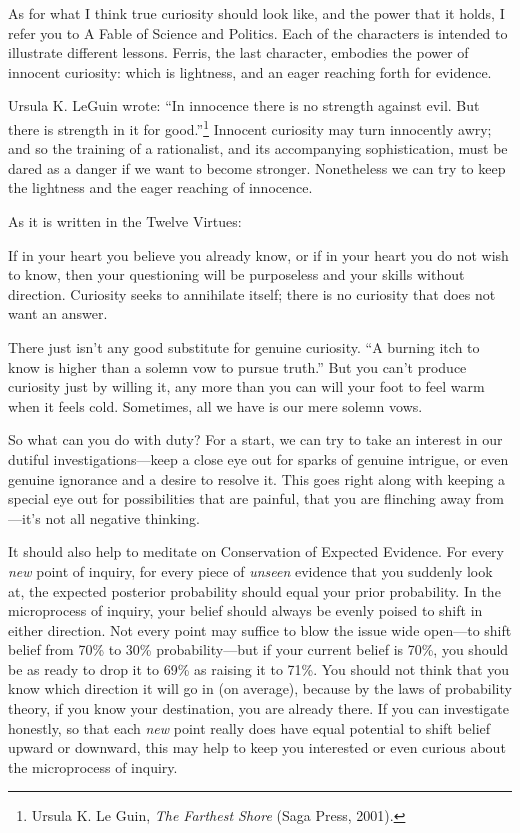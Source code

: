 {
 As for what I think true curiosity should look like, and the power
that it holds, I refer you to A Fable of Science and Politics. Each of
the characters is intended to illustrate different lessons. Ferris, the
last character, embodies the power of innocent curiosity: which is
lightness, and an eager reaching forth for evidence.}

{
 Ursula K. LeGuin wrote: ``In innocence there is
no strength against evil. But there is strength in it for
good.''\footnote{Ursula K. Le Guin, \textit{The Farthest Shore} (Saga Press,
2001).} Innocent curiosity may
turn innocently awry; and so the training of a rationalist, and its
accompanying sophistication, must be dared as a danger if we want to
become stronger. Nonetheless we can try to keep the lightness and the
eager reaching of innocence.}

{
 As it is written in the Twelve Virtues:}

{
 If in your heart you believe you already know, or if in your heart
you do not wish to know, then your questioning will be purposeless and
your skills without direction. Curiosity seeks to annihilate itself;
there is no curiosity that does not want an answer.}

{
 There just isn't any good substitute for genuine
curiosity. ``A burning itch to know is higher than a
solemn vow to pursue truth.'' But you
can't produce curiosity just by willing it, any more
than you can will your foot to feel warm when it feels cold. Sometimes,
all we have is our mere solemn vows.}

{
 So what can you do with duty? For a start, we can try to take an
interest in our dutiful investigations---keep a close eye out for
sparks of genuine intrigue, or even genuine ignorance and a desire to
resolve it. This goes right along with keeping a special eye out for
possibilities that are painful, that you are flinching away
from---it's not all negative thinking.}

{
 It should also help to meditate on Conservation of Expected
Evidence. For every \textit{new} point of inquiry, for every piece of
\textit{unseen} evidence that you suddenly look at, the expected
posterior probability should equal your prior probability. In the
microprocess of inquiry, your belief should always be evenly poised to
shift in either direction. Not every point may suffice to blow the
issue wide open---to shift belief from 70\% to 30\% probability---but
if your current belief is 70\%, you should be as ready to drop it to
69\% as raising it to 71\%. You should not think that you know which
direction it will go in (on average), because by the laws of
probability theory, if you know your destination, you are already
there. If you can investigate honestly, so that each \textit{new} point
really does have equal potential to shift belief upward or downward,
this may help to keep you interested or even curious about the
microprocess of inquiry.}

